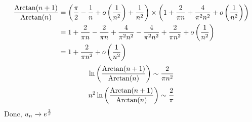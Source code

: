 \begin{itemize}
		\begin{align*}
			\frac{\operatorname{Arctan}(n+1)}{\operatorname{Arctan}(n)} &= \left( \frac{\pi}{2} - \frac{1}{n} + o\left( \frac{1}{n^2}\right) + \frac{1}{n^2} \right) \times \left( 1+\frac{2}{\pi n} + \frac{4}{\pi^2 n^2} + o\left( \frac{1}{n^2} \right)  \right)\\
			&= 1 + \frac{2}{\pi n} - \frac{2}{\pi n} + \frac{4}{\pi^2 n^2} - \frac{4}{\pi^2 n^2} + \frac{2}{\pi n^2} + o\left( \frac{1}{n^2} \right) \\
			&= 1 + \frac{2}{\pi n^2} + o\left( \frac{1}{n^2} \right)  \\
		\end{align*}
		 \[
		\ln\left( \frac{\operatorname{Arctan}(n+1)}{\operatorname{Arctan}(n)} \right) \sim \frac{2}{\pi n^2}
		\]\[
		n^2 \ln\left( \frac{\operatorname{Arctan}(n+1)}{\operatorname{Arctan}(n)} \right) \sim \frac{2}{\pi}
		\] Donc, $u_n \xrightarrow[]{} e^{\frac{2}{\pi}}$
\end{itemize}

